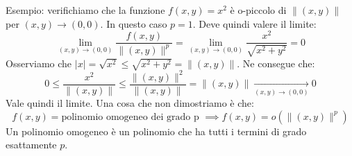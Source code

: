 Esempio: verifichiamo che la funzione $f(x, y) = x^2$ è o-piccolo di $\lVert (x, y) \rVert$ per $(x, y) \to (0, 0)$. In questo caso $p = 1$. Deve quindi valere il limite:
\begin{equation*}
	\lim_{(x, y) \to (0, 0)} \dfrac{f(x, y)}{\lVert (x, y) \rVert^p} = \lim_{(x, y) \to (0, 0)} \dfrac{x^2}{\sqrt{x^2 + y^2}} = 0
\end{equation*}
Osserviamo che $|x| = \sqrt{x^2} \leq \sqrt{x^2 + y^2} = \lVert (x, y) \rVert$. Ne consegue che:
\begin{equation*}
	0 \leq \dfrac{x^2}{\lVert (x, y) \rVert} \leq \dfrac{\lVert (x, y) \rVert^2}{\lVert (x, y) \rVert} = \lVert (x, y) \rVert \xrightarrow[(x, y) \to (0, 0)]{} 0
\end{equation*}
Vale quindi il limite. Una cosa che non dimostriamo è che:
\begin{equation*}
	f(x, y) = \text{polinomio omogeneo dei grado p } \implies f(x, y) = o(\lVert (x, y) \rVert^p)
\end{equation*}
Un polinomio omogeneo è un polinomio che ha tutti i termini di grado esattamente $p$.

